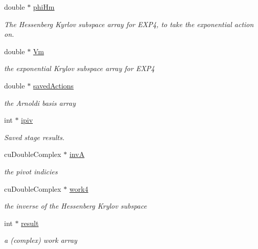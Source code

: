 \begin{DoxyCompactItemize}
double $\ast$ \hyperlink{structexprb43cu_1_1solver__memory_aebb83d142ab8d04edad3538544c67ec4}{phi\+Hm}
\begin{DoxyCompactList}\small\item\em The Hessenberg Kyrlov subspace array for E\+X\+P4, to take the exponential action on. \end{DoxyCompactList}\item 
double $\ast$ \hyperlink{structexprb43cu_1_1solver__memory_a3b68c5a632fe265037cd25195e266c65}{Vm}
\begin{DoxyCompactList}\small\item\em the exponential Krylov subspace array for E\+X\+P4 \end{DoxyCompactList}\item 
double $\ast$ \hyperlink{structexprb43cu_1_1solver__memory_aee268d381ce2f3ab02754793dfd068ee}{saved\+Actions}
\begin{DoxyCompactList}\small\item\em the Arnoldi basis array \end{DoxyCompactList}\item 
int $\ast$ \hyperlink{structexprb43cu_1_1solver__memory_ad00e33aaa4241cc8356ea30869d311ff}{ipiv}
\begin{DoxyCompactList}\small\item\em Saved stage results. \end{DoxyCompactList}\item 
cu\+Double\+Complex $\ast$ \hyperlink{structexprb43cu_1_1solver__memory_a41d0878433e4e8e15ce8403b8efc8c23}{invA}
\begin{DoxyCompactList}\small\item\em the pivot indicies \end{DoxyCompactList}\item 
cu\+Double\+Complex $\ast$ \hyperlink{structexprb43cu_1_1solver__memory_a7db0969d6909faa9beb4965290c52a63}{work4}
\begin{DoxyCompactList}\small\item\em the inverse of the Hessenberg Krylov subspace \end{DoxyCompactList}\item 
int $\ast$ \hyperlink{structexprb43cu_1_1solver__memory_a69d7ae536d679306d284b461a8bdb2c3}{result}
\begin{DoxyCompactList}\small\item\em a (complex) work array \end{DoxyCompactList}\end{DoxyCompactItemize}


